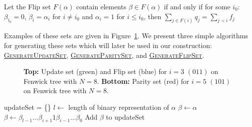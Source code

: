 \begin{definition} Let the Flip set $F(\alpha)$ contain elements $\beta \in F(\alpha)$ if and only if for some $i_0$: $\beta_{i_0} = 0$, $\beta_i = \alpha_i$ for $i\neq i_0$ and $\alpha_i = 1$ for $i\leq i_0$, then $
 \sum_{j \in F(i)} q_j = \sum_{j \prec i} f_j$
\end{definition}

Examples of these sets are given in Figure~\ref{fenwick_trees}. We present three simple algorithms for generating these sets which will later be used in our construction: \hyperref[GenerateUpdateSet]{\textsc{GenerateUpdateSet}}, \hyperref[GenerateParitySet]{\textsc{GenerateParitySet}}, and \hyperref[GenerateFlipSet]{\textsc{GenerateFlipSet}}.
\begin{figure}[htbp]
\caption{\label{fenwick_trees} \textbf{Top:}  Update set (green) and Flip set (blue) for $i=3$ $(011)$ on Fenwick tree with $N=8$. \textbf{Bottom:} Parity set (red) for $i=5$ $(101)$ on Fenwick tree with $N=8$.}
\end{figure} \noindent

\begin{algorithm}[htbp]
\caption{\textsc{GenerateUpdateSet}\label{GenerateUpdateSet}}
\begin{algorithmic}[1]
\State updateSet = \{\}
\State $l \gets $ length of binary representation of $\alpha$
\State $\beta \gets \alpha$
        \State $\beta \gets \beta_{l-1}\ldots\beta_{i+1}1\beta_{i-1}\ldots\beta_0$
            \State Add $\beta$ to updateSet
        \EndIf
    \EndIf
\EndFor

\end{algorithmic}
\end{algorithm}

